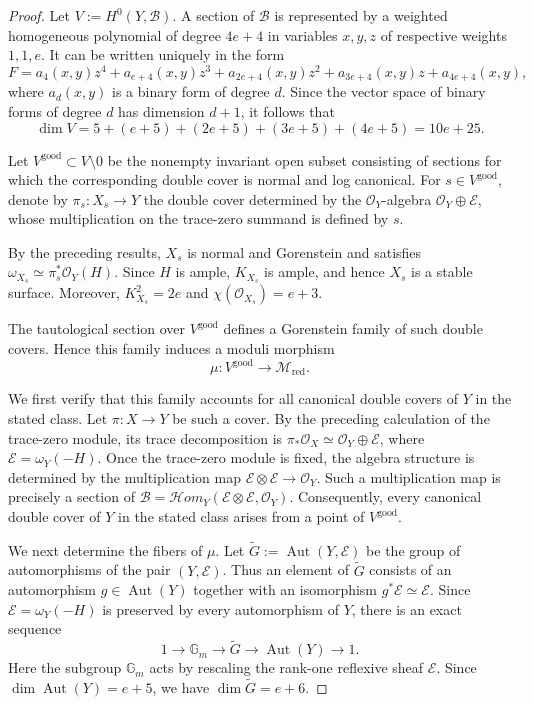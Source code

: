 \documentclass[11pt,twoside]{amsart}
\theoremstyle{plain}
\numberwithin{equation}{section}
\theoremstyle{definition}
\begin{document}
\begin{proof}
Let $V:=H^0(Y,\mathcal B)$. A section of $\mathcal B$ is represented by a weighted homogeneous polynomial of degree $4e+4$ in variables $x,y,z$ of respective weights $1,1,e$. It can be written uniquely in the form
$$
F=a_4(x,y)z^4+a_{e+4}(x,y)z^3+a_{2e+4}(x,y)z^2
+a_{3e+4}(x,y)z+a_{4e+4}(x,y),
$$
where $a_d(x,y)$ is a binary form of degree $d$. Since the vector space of binary forms of degree $d$ has dimension $d+1$, it follows that
$$
\dim V=5+(e+5)+(2e+5)+(3e+5)+(4e+5)=10e+25.
$$

Let $V^{\mathrm{good}}\subset V\setminus{0}$ be the nonempty invariant open subset consisting of sections for which the corresponding double cover is normal and log canonical. For $s\in V^{\mathrm{good}}$, denote by $\pi_s:X_s\to Y$ the double cover determined by the $\mathcal O_Y$-algebra $\mathcal O_Y\oplus\mathcal E$, whose multiplication on the trace-zero summand is defined by $s$.

By the preceding results, $X_s$ is normal and Gorenstein and satisfies $\omega_{X_s}\simeq\pi_s^*\mathcal O_Y(H)$. Since $H$ is ample, $K_{X_s}$ is ample, and hence $X_s$ is a stable surface. Moreover, $K_{X_s}^2=2e$ and $\chi(\mathcal O_{X_s})=e+3$.

The tautological section over $V^{\mathrm{good}}$ defines a Gorenstein family of such double covers. Hence this family induces a moduli morphism
$$
\mu:V^{\mathrm{good}}\longrightarrow\mathcal M_{\mathrm{red}}.
$$

We first verify that this family accounts for all canonical double covers of $Y$ in the stated class. Let $\pi:X\to Y$ be such a cover. By the preceding calculation of the trace-zero module, its trace decomposition is $\pi_*\mathcal O_X\simeq\mathcal O_Y\oplus\mathcal E$, where $\mathcal E=\omega_Y(-H)$. Once the trace-zero module is fixed, the algebra structure is determined by the multiplication map $\mathcal E\otimes\mathcal E\to\mathcal O_Y$. Such a multiplication map is precisely a section of $\mathcal B=\mathcal H om_Y(\mathcal E\otimes\mathcal E,\mathcal O_Y)$. Consequently, every canonical double cover of $Y$ in the stated class arises from a point of $V^{\mathrm{good}}$.

We next determine the fibers of $\mu$. Let $\widetilde G:=\operatorname{Aut}(Y,\mathcal E)$ be the group of automorphisms of the pair $(Y,\mathcal E)$. Thus an element of $\widetilde G$ consists of an automorphism $g\in\operatorname{Aut}(Y)$ together with an isomorphism $g^*\mathcal E\simeq\mathcal E$. Since $\mathcal E=\omega_Y(-H)$ is preserved by every automorphism of $Y$, there is an exact sequence
$$
1\longrightarrow\mathbb G_m\longrightarrow\widetilde G
\longrightarrow\operatorname{Aut}(Y)\longrightarrow1.
$$
Here the subgroup $\mathbb G_m$ acts by rescaling the rank-one reflexive sheaf $\mathcal E$. Since $\dim\operatorname{Aut}(Y)=e+5$, we have $\dim\widetilde G=e+6$.


\end{proof}
\end{document}
